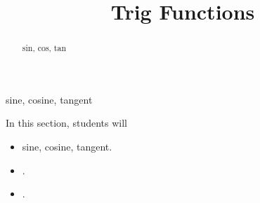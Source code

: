 \documentclass{ximera}
\title{Trig Functions}
\begin{document}
\begin{abstract}
sin, cos, tan
\end{abstract}
\maketitle




sine, cosine, tangent

\begin{sectionOutcomes}
In this section, students will 

\begin{itemize}
\item sine, cosine, tangent.
\item .
\item .
\end{itemize}
\end{sectionOutcomes}
\end{document}
